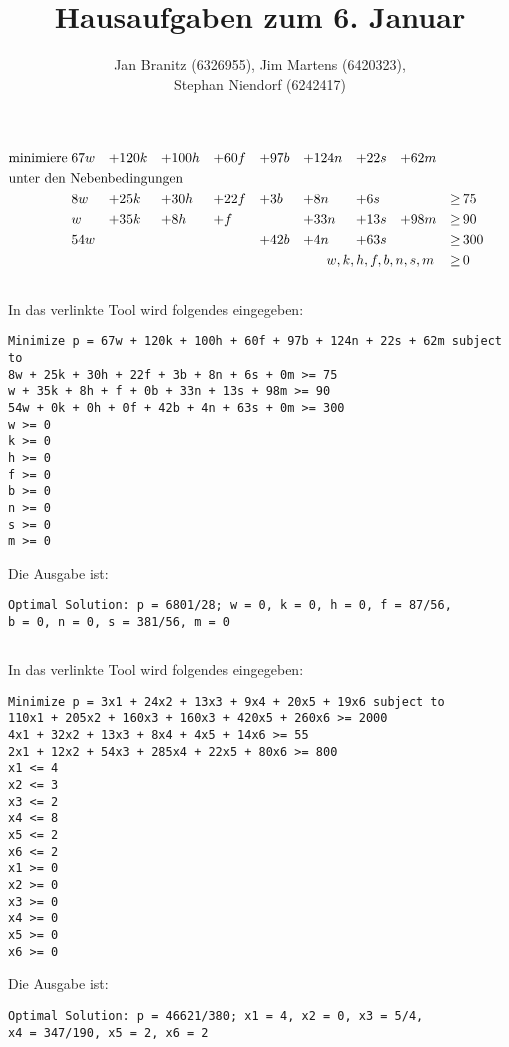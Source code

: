 \documentclass[10pt,a4paper,oneside,ngerman,numbers=noenddot]{scrartcl}
\begin{document}
\author{Jan Branitz (6326955), Jim Martens (6420323),\\
Stephan Niendorf (6242417)}
\title{Hausaufgaben zum 6. Januar}
\maketitle
\section{} %
	
\section{} %
	\subsection{} %
		\begin{alignat*}{9}
			\text{minimiere}\; & 67w &+& 120k &+& 100h &+& 60f &+& 97b &+& 124n &+& 22s &+& 62m &&  \\
			\multicolumn{18}{l}{\text{unter den Nebenbedingungen}} && \\
			& 8w &+& 25k &+& 30h &+& 22f &+& 3b &+& 8n &+& 6s && &\geq &\, 75 \\
			& w &+& 35k &+& 8h &+& f && &+& 33n &+& 13s &+& 98m &\geq &\, 90 \\
			& 54w && && && &+& 42b &+& 4n &+& 63s && &\geq &\, 300 \\
			\multicolumn{16}{r}{$w, k, h, f, b, n, s, m$} \,&\geq &\, 0
		\end{alignat*}
	\subsection{} %
		In das verlinkte Tool wird folgendes eingegeben:
\begin{verbatim}
Minimize p = 67w + 120k + 100h + 60f + 97b + 124n + 22s + 62m subject to
8w + 25k + 30h + 22f + 3b + 8n + 6s + 0m >= 75
w + 35k + 8h + f + 0b + 33n + 13s + 98m >= 90
54w + 0k + 0h + 0f + 42b + 4n + 63s + 0m >= 300
w >= 0
k >= 0
h >= 0
f >= 0
b >= 0
n >= 0
s >= 0
m >= 0
\end{verbatim}
		Die Ausgabe ist:
\begin{verbatim}
Optimal Solution: p = 6801/28; w = 0, k = 0, h = 0, f = 87/56, 
b = 0, n = 0, s = 381/56, m = 0
\end{verbatim}
	\subsection{} %
		In das verlinkte Tool wird folgendes eingegeben:
\begin{verbatim}
Minimize p = 3x1 + 24x2 + 13x3 + 9x4 + 20x5 + 19x6 subject to
110x1 + 205x2 + 160x3 + 160x3 + 420x5 + 260x6 >= 2000
4x1 + 32x2 + 13x3 + 8x4 + 4x5 + 14x6 >= 55
2x1 + 12x2 + 54x3 + 285x4 + 22x5 + 80x6 >= 800
x1 <= 4
x2 <= 3
x3 <= 2
x4 <= 8
x5 <= 2
x6 <= 2
x1 >= 0
x2 >= 0
x3 >= 0
x4 >= 0
x5 >= 0
x6 >= 0
\end{verbatim}
		Die Ausgabe ist: 
\begin{verbatim}
Optimal Solution: p = 46621/380; x1 = 4, x2 = 0, x3 = 5/4, 
x4 = 347/190, x5 = 2, x6 = 2
\end{verbatim}
\end{document}
